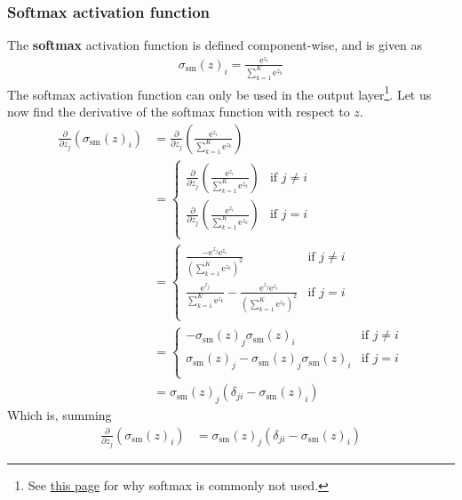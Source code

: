 \documentclass[a4paper,10pt]{article}
\newcommand{\e}[1]{\mathrm{e}^{#1}}
\begin{document}
\subsubsection{Softmax activation function}
The \textbf{softmax} activation function is defined component-wise, and is given as
\begin{align}
    \sigma_\mathrm{sm}(z)_i = \frac{\e{z_i}}{\sum^{K}_{k=1}\e{z_k}}
    \label{eq:softmax-activation}
\end{align}
The softmax activation function can only be used in the output layer\footnote{See \href{https://stackoverflow.com/questions/37588632/why-use-softmax-only-in-the-output-layer-and-not-in-hidden-layers}{this page} for why softmax is commonly not used.}. Let us now find the derivative of the softmax function with respect to $z$.
\begin{align*}
    \frac{\partial}{\partial z_j} \left( \sigma_\mathrm{sm}(z)_i \right) &= \frac{\partial}{\partial z_j}\left( \frac{\e{z_i}}{\sum^K_{k=1} \e{z_k}} \right) \\
    &= \begin{cases}
        \frac{\partial}{\partial z_j} \left(\frac{\e{z_i}}{\sum^K_{k=1} \e{z_k}} \right)
         & \text{if } j \neq i \\
        \frac{\partial}{\partial z_j} \left( \frac{\e{z_i}}{\sum^K_{k=1} \e{z_k}} \right)
         & \text{if } j = i \\
    \end{cases} \\
    &= \begin{cases}
        \frac{- \e{z_j}\e{z_i}}{\left( \sum^K_{k=1} \e{z_k} \right)^2}
         & \text{if } j \neq i \\
        \frac{\e{z_j}}{\sum^K_{k=1} \e{z_k}} - \frac{\e{z_j}\e{z_i}}{\left( \sum^K_{k=1} \e{z_k} \right)^2}
         & \text{if } j = i \\
    \end{cases} \\
    &= \begin{cases}
        - \sigma_\mathrm{sm}(z)_j \sigma_\mathrm{sm}(z)_i
         & \text{if } j \neq i \\
        \sigma_\mathrm{sm}(z)_j - \sigma_\mathrm{sm}(z)_j \sigma_\mathrm{sm}(z)_i
         & \text{if } j = i \\
    \end{cases} \\
    &= \sigma_\mathrm{sm}(z)_j \left( \delta_{ji} - \sigma_\mathrm{sm}(z)_i \right)
\end{align*}
Which is, summing
\begin{align}
    \frac{\partial}{\partial z_j} \left(\sigma_\mathrm{sm}(z)_i\right) &= \sigma_\mathrm{sm}(z)_j \left( \delta_{ji} - \sigma_\mathrm{sm}(z)_i \right)
    \label{eq:softmax-derivative}
\end{align}
\end{document}
